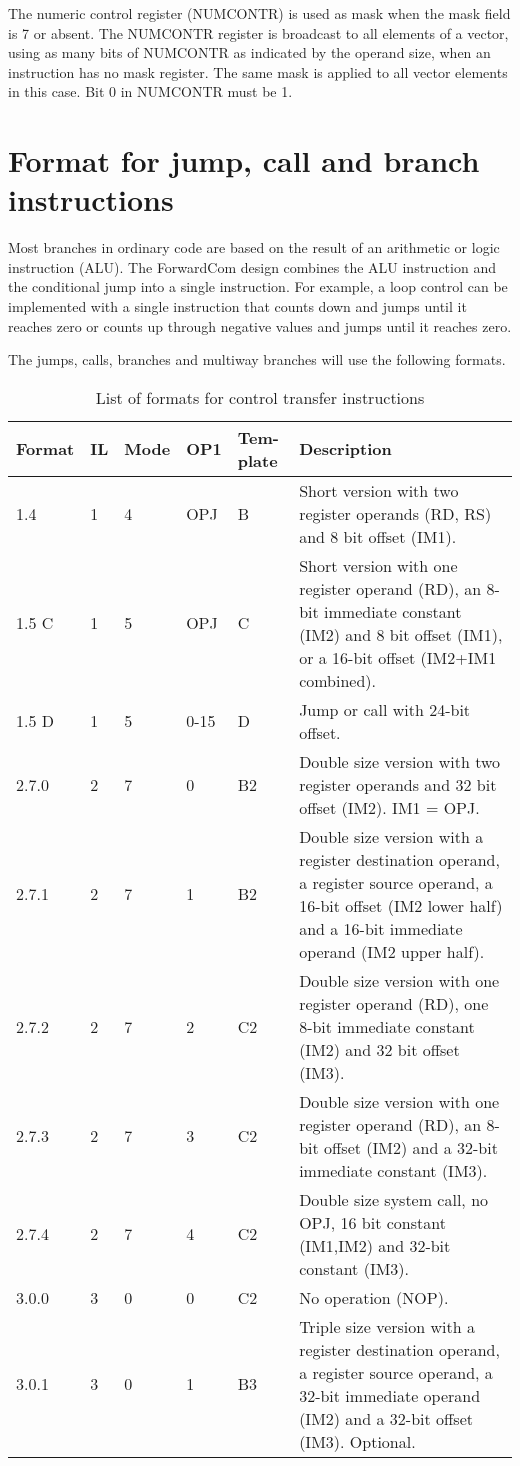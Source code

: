 \documentclass[forwardcom.tex]{subfiles}
\begin{document}
The numeric control register (NUMCONTR) is used as mask when the mask field is 7 or absent. The NUMCONTR register is broadcast to all elements of a vector, using as many bits of NUMCONTR as indicated by the operand size, when an instruction has no mask register. 
The same mask is applied to all vector elements in this case. 
Bit 0 in NUMCONTR must be 1.

\section{Format for jump, call and branch instructions}
Most branches in ordinary code are based on the result of an arithmetic or logic instruction (ALU). The ForwardCom design combines the ALU instruction and the conditional jump into a single instruction. For example, a loop control can be implemented with a single instruction that counts down and jumps until it reaches zero or counts up through negative values and jumps until it reaches zero.
\vspace{2mm}

The jumps, calls, branches and multiway branches will use the following formats.

\begin{longtable}
{|p{10mm}|p{8mm}|p{8mm}|p{8mm}|p{8mm}|p{70mm}|}
\caption{List of formats for control transfer instructions}
\label{table:jumpInstructionFormats}
\endfirsthead
\endhead
\hline
Format & IL & Mode & OP1 & Tem-plate & Description \\
\hline
1.4 & 1 & 4 & OPJ & B & Short version with two register operands (RD, RS) and 8 bit offset  (IM1).  \\
\hline
1.5 C & 1 & 5 & OPJ & C & Short version with one register operand (RD), an 8-bit immediate constant (IM2) and 8 bit offset (IM1), or a 16-bit offset (IM2+IM1 combined). \\
\hline
1.5 D & 1 & 5 & 0-15 & D & Jump or call with 24-bit offset. \\
\hline
2.7.0 & 2 & 7 & 0 & B2 & Double size version with two register operands and 32 bit offset  (IM2). IM1 = OPJ. \\
\hline
2.7.1 & 2 & 7 & 1 & B2 & Double size version with a register destination operand, a register source operand, a 16-bit offset (IM2 lower half) and a 16-bit immediate operand (IM2 upper half).  \\
\hline
2.7.2 & 2 & 7 & 2 & C2 & Double size version with one register operand (RD), one 8-bit immediate constant (IM2) and 32 bit offset (IM3). \\
\hline
2.7.3 & 2 & 7 & 3 & C2 & Double size version with one register operand (RD), an 8-bit offset (IM2) and a 32-bit immediate constant (IM3).  \\
\hline
2.7.4 & 2 & 7 & 4 & C2 & Double size system call, no OPJ, 16 bit constant (IM1,IM2) and 32-bit constant (IM3). \\
\hline
3.0.0 & 3 & 0 & 0 & C2 & No operation (NOP). \\
\hline
3.0.1 & 3 & 0 & 1 & B3 & Triple size version with a register destination operand, a register source operand, a 32-bit immediate operand (IM2) and a 32-bit offset (IM3). Optional.  \\
\hline
\end{longtable}
\end{document}
